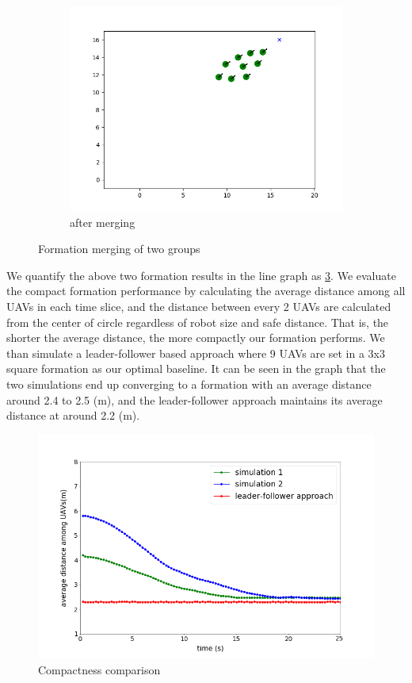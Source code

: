 \begin{figure}[htbp]
\begin{subfigure}[b]{0.3\textwidth}
         \centering
         \includegraphics[width=\textwidth]{figures/merge_3.png}
         \caption{after merging}
         \label{fig:merging_c}
     \end{subfigure}
        \caption{Formation merging of two groups}
        \label{fig:merging}
\end{figure}

We quantify the above two formation results in the line graph as \ref{fig:comparison}. We evaluate the compact formation performance by calculating the average distance among all UAVs in each time slice, and the distance between every 2 UAVs are calculated from the center of circle regardless of robot size and safe distance. That is, the shorter the average distance, the more compactly our formation performs. We than simulate a leader-follower based approach where 9 UAVs are set in a 3x3 square formation as our optimal baseline. It can be seen in the graph that the two simulations end up converging to a formation with an average distance around 2.4 to 2.5 (m), and the leader-follower approach maintains its average distance at around 2.2 (m).

\begin{figure}[H]
    \centering
    \includegraphics[scale=1]{figures/average_distance_comparison.png}
    \caption{Compactness comparison}
    \label{fig:comparison}
\end{figure}

